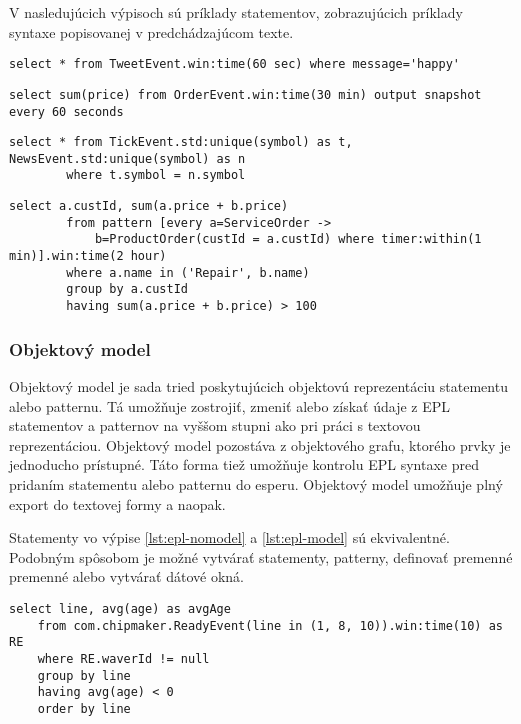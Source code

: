 		V nasledujúcich výpisoch sú príklady statementov, zobrazujúcich príklady syntaxe popisovanej v predchádzajúcom texte.
		\begin{lstlisting}[label=lst:epl-simple,caption=Jednoduchý EPL statement]
		select * from TweetEvent.win:time(60 sec) where message='happy'
		\end{lstlisting}
		
		\begin{lstlisting}[label=lst:output-example,caption=EPL statement s výstupom každých 60 sekúnd]
		select sum(price) from OrderEvent.win:time(30 min) output snapshot every 60 seconds
		\end{lstlisting}

		\begin{lstlisting}[label=lst:epl-join,caption=Jednoduchý EPL statements použitím join]
		select * from TickEvent.std:unique(symbol) as t, NewsEvent.std:unique(symbol) as n
		where t.symbol = n.symbol
		\end{lstlisting}

		\begin{lstlisting}[label=lst:epl-pattern,caption=EPL statement s použitím patternu]
		select a.custId, sum(a.price + b.price)
		from pattern [every a=ServiceOrder -> 
			b=ProductOrder(custId = a.custId) where timer:within(1 min)].win:time(2 hour) 
		where a.name in ('Repair', b.name)
		group by a.custId
		having sum(a.price + b.price) > 100
		\end{lstlisting}
				
		\subsubsection{Objektový model}	
		Objektový model je sada tried poskytujúcich objektovú reprezentáciu statementu alebo patternu. Tá umožňuje zostrojiť, zmeniť alebo získať údaje z EPL statementov a patternov na vyššom stupni ako pri práci s textovou reprezentáciou. Objektový model pozostáva z objektového grafu, ktorého prvky je jednoducho prístupné. Táto forma tiež umožňuje kontrolu EPL syntaxe pred pridaním statementu alebo patternu do esperu. Objektový model umožňuje plný export do textovej formy a naopak.
		
		Statementy vo výpise \ref{lst:epl-nomodel} a \ref{lst:epl-model} sú ekvivalentné. Podobným spôsobom je možné vytvárať statementy, patterny, definovať premenné premenné alebo vytvárať dátové okná.
		
		\begin{lstlisting}[label=lst:epl-nomodel,caption=EPL statement bez použitia objektového modelu]
	select line, avg(age) as avgAge 
	from com.chipmaker.ReadyEvent(line in (1, 8, 10)).win:time(10) as RE
	where RE.waverId != null
	group by line 
	having avg(age) < 0
	order by line
		\end{lstlisting}
		
